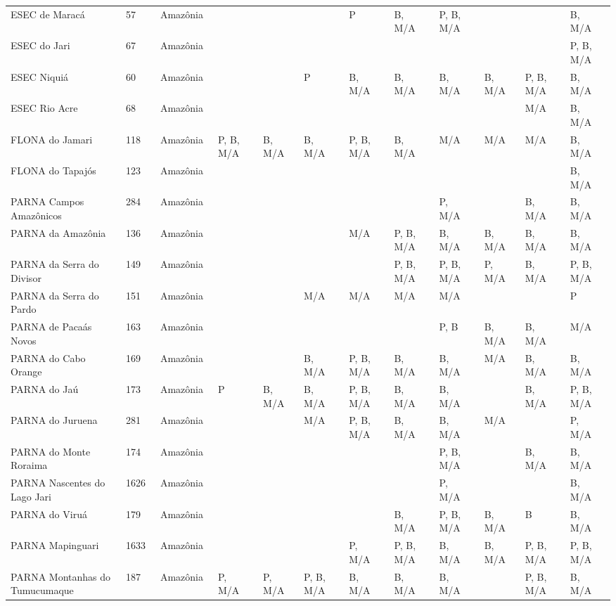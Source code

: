 \documentclass[
  letterpaper,
]{scrbook}
\begin{document}
\begin{longtable}[t]{lllllllll>{}lll}
ESEC de Maracá  & 57  & Amazônia  &  &  &  & P  & B, M/A  & P, B, M/A  &  &  & B, M/A \\
ESEC do Jari  & 67  & Amazônia  &  &  &  &  &  &  &  &  & P, B, M/A \\
\addlinespace
ESEC Niquiá  & 60  & Amazônia  &  &  & P  & B, M/A  & B, M/A  & B, M/A  & B, M/A  & P, B, M/A  & B, M/A \\
ESEC Rio Acre  & 68  & Amazônia  &  &  &  &  &  &  &  & M/A  & B, M/A \\
FLONA do Jamari  & 118  & Amazônia  & P, B, M/A  & B, M/A  & B, M/A  & P, B, M/A  & B, M/A  & M/A  & M/A  & M/A  & B, M/A \\
FLONA do Tapajós  & 123  & Amazônia  &  &  &  &  &  &  &  &  & B, M/A \\
PARNA Campos Amazônicos  & 284  & Amazônia  &  &  &  &  &  & P, M/A  &  & B, M/A  & B, M/A \\
\addlinespace
PARNA da Amazônia  & 136  & Amazônia  &  &  &  & M/A  & P, B, M/A  & B, M/A  & B, M/A  & B, M/A  & B, M/A \\
PARNA da Serra do Divisor  & 149  & Amazônia  &  &  &  &  & P, B, M/A  & P, B, M/A  & P, M/A  & B, M/A  & P, B, M/A \\
PARNA da Serra do Pardo  & 151  & Amazônia  &  &  & M/A  & M/A  & M/A  & M/A  &  &  & P \\
PARNA de Pacaás Novos  & 163  & Amazônia  &  &  &  &  &  & P, B  & B, M/A  & B, M/A  & M/A \\
PARNA do Cabo Orange  & 169  & Amazônia  &  &  & B, M/A  & P, B, M/A  & B, M/A  & B, M/A  & M/A  & B, M/A  & B, M/A \\
\addlinespace
PARNA do Jaú  & 173  & Amazônia  & P  & B, M/A  & B, M/A  & P, B, M/A  & B, M/A  & B, M/A  &  & B, M/A  & P, B, M/A \\
PARNA do Juruena  & 281  & Amazônia  &  &  & M/A  & P, B, M/A  & B, M/A  & B, M/A  & M/A  &  & P, M/A \\
PARNA do Monte Roraima  & 174  & Amazônia  &  &  &  &  &  & P, B, M/A  &  & B, M/A  & B, M/A \\
PARNA Nascentes do Lago Jari  & 1626  & Amazônia  &  &  &  &  &  & P, M/A  &  &  & B, M/A \\
PARNA do Viruá  & 179  & Amazônia  &  &  &  &  & B, M/A  & P, B, M/A  & B, M/A  & B  & B, M/A \\
\addlinespace
PARNA Mapinguari  & 1633  & Amazônia  &  &  &  & P, M/A  & P, B, M/A  & B, M/A  & B, M/A  & P, B, M/A  & P, B, M/A \\
PARNA Montanhas do Tumucumaque  & 187  & Amazônia  & P, M/A  & P, M/A  & P, B, M/A  & B, M/A  & B, M/A  & B, M/A  &  & P, B, M/A  & B, M/A \\

\end{longtable}
\end{document}
